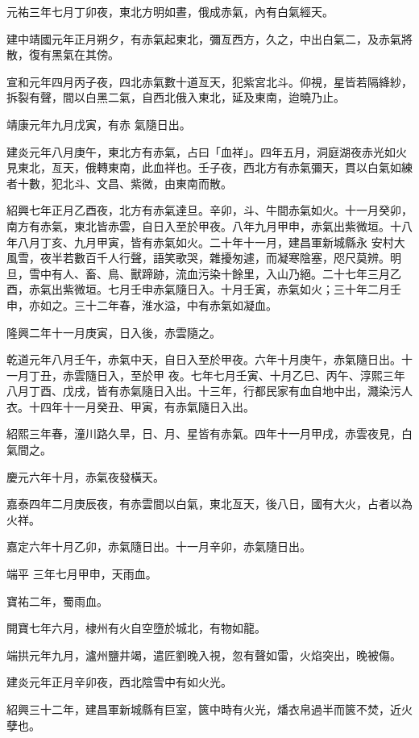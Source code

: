 \begin{pinyinscope}
 元祐三年七月丁卯夜，東北方明如晝，俄成赤氣，內有白氣經天。



 建中靖國元年正月朔夕，有赤氣起東北，彌亙西方，久之，中出白氣二，及赤氣將散，復有黑氣在其傍。



 宣和元年四月丙子夜，四北赤氣數十道亙天，犯紫宮北斗。仰視，星皆若隔絳紗，拆裂有聲，間以白黑二氣，自西北俄入東北，延及東南，迨曉乃止。



 靖康元年九月戊寅，有赤
 氣隨日出。



 建炎元年八月庚午，東北方有赤氣，占曰「血祥」。四年五月，洞庭湖夜赤光如火見東北，亙天，俄轉東南，此血祥也。壬子夜，西北方有赤氣彌天，貫以白氣如練者十數，犯北斗、文昌、紫微，由東南而散。



 紹興七年正月乙酉夜，北方有赤氣達旦。辛卯，斗、牛間赤氣如火。十一月癸卯，南方有赤氣，東北皆赤雲，自日入至於甲夜。八年九月甲申，赤氣出紫微垣。十八年八月丁亥、九月甲寅，皆有赤氣如火。二十年十一月，建昌軍新城縣永
 安村大風雪，夜半若數百千人行聲，語笑歌哭，雜擾匆遽，而凝寒陰塞，咫尺莫辨。明旦，雪中有人、畜、鳥、獸蹄跡，流血污染十餘里，入山乃絕。二十七年三月乙酉，赤氣出紫微垣。七月壬申赤氣隨日入。十月壬寅，赤氣如火；三十年二月壬申，亦如之。三十二年春，淮水溢，中有赤氣如凝血。



 隆興二年十一月庚寅，日入後，赤雲隨之。



 乾道元年八月壬午，赤氣中天，自日入至於甲夜。六年十月庚午，赤氣隨日出。十一月丁丑，赤雲隨日入，至於甲
 夜。七年七月壬寅、十月乙巳、丙午、淳熙三年八月丁酉、戊戌，皆有赤氣隨日入出。十三年，行都民家有血自地中出，濺染污人衣。十四年十一月癸丑、甲寅，有赤氣隨日入出。



 紹熙三年春，潼川路久旱，日、月、星皆有赤氣。四年十一月甲戌，赤雲夜見，白氣間之。



 慶元六年十月，赤氣夜發橫天。



 嘉泰四年二月庚辰夜，有赤雲間以白氣，東北亙天，後八日，國有大火，占者以為火祥。



 嘉定六年十月乙卯，赤氣隨日出。十一月辛卯，赤氣隨日出。



 端平
 三年七月甲申，天雨血。



 寶祐二年，蜀雨血。



 開寶七年六月，棣州有火自空墮於城北，有物如龍。



 端拱元年九月，瀘州鹽井竭，遣匠劉晚入視，忽有聲如雷，火焰突出，晚被傷。



 建炎元年正月辛卯夜，西北陰雪中有如火光。



 紹興三十二年，建昌軍新城縣有巨室，篋中時有火光，燔衣帛過半而篋不焚，近火孽也。



\end{pinyinscope}